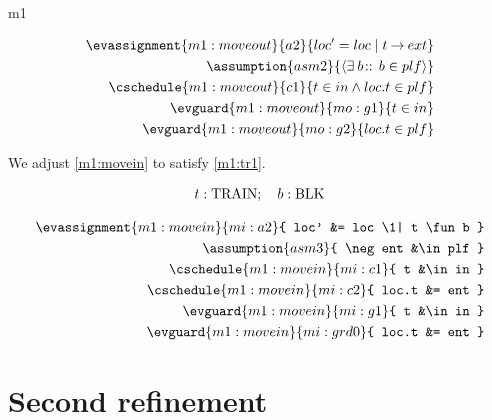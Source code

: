 \documentclass[12pt]{amsart}
\begin{document}
\begin{machine}{m1}

\begin{align*}
\evassignment{m1:moveout}{a2}{ loc' = loc \1 | t \fun ext }
\\ \assumption{asm2}
	{ \qexists{b}{}{b \in plf} }
\\ \cschedule{m1:moveout}{c1}{ t \in in \land loc.t \in plf }
\\ \evguard{m1:moveout}{mo:g1}{ t \in in }
\\ \evguard{m1:moveout}{mo:g2}{ loc.t \in plf }
\end{align*}

We adjust \ref{m1:movein} to satisfy \ref{m1:tr1}.


\begin{align*}
\indices{m1:movein}{	t : \Train} ; \quad
\param{m1:movein}{ b : \Blk }
\end{align*}

\begin{align*}
\evassignment{m1:movein}{mi:a2}
	{ loc' &= loc \1| t \fun b }
\\ \assumption{asm3}
	{ \neg ent &\in plf }
\\ \cschedule{m1:movein}{mi:c1}{ t &\in in } 
\\ \cschedule{m1:movein}{mi:c2}{ loc.t &= ent }
\\ \evguard{m1:movein}{mi:g1}{ t &\in in }
\\ \evguard{m1:movein}{mi:grd0}
	{ loc.t &= ent } %
\end{align*}
%
\end{machine}

\section{Second refinement}
\end{document}
